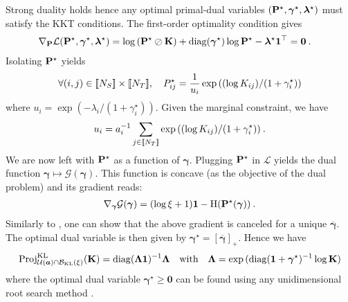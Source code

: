     Strong duality holds hence any optimal primal-dual variables $({\mathbf{P}}^\star, \bm{\gamma}^\star, \bm{\lambda}^\star)$ must satisfy the KKT conditions. The first-order optimality condition gives
    \begin{align}
        \nabla_{{\mathbf{P}}} \mathcal{L} ({\mathbf{P}}^\star, \bm{\gamma}^\star, \bm{\lambda}^\star) &= \log \left( {\mathbf{P}}^\star \oslash {\mathbf{K}} \right) + \operatorname{diag}(\bm{\gamma}^\star)\log{{\mathbf{P}}^\star} - \bm{\lambda}^\star \bm{1}^\top = \bm{0} \:.
    \end{align}
    Isolating ${\mathbf{P}}^\star$ yields
    \begin{align}
        \forall (i,j) \in {[\![N_S]\!]} \times {[\![N_T]\!]}, \quad P^\star_{ij} = \frac{1}{u_i} \exp{((\log K_{ij})/(1 + \gamma^\star_i))}
    \end{align}
    where $u_i = \exp{(-\lambda_i/(1 + \gamma^\star_i))}$. Given the marginal constraint, we have 
    \begin{equation}
        u_i = a_i^{-1} \sum_{j \in {[\![N_T]\!]}} \exp{((\log K_{ij})/(1 + \gamma^\star_i))} \:.
    \end{equation}
    We are now left with ${\mathbf{P}}^\star$ as a function of $\bm{\gamma}$. Plugging ${\mathbf{P}}^\star$ in $\mathcal{L}$ yields the dual function $\bm{\gamma} \mapsto \mathcal{G}(\bm{\gamma})$. This function is concave (as the objective of the dual problem) and its gradient reads:
    \begin{align}
        \nabla_{\bm{\gamma}} \mathcal{G}(\bm{\gamma}) = (\log \xi + 1 )\bm{1} - \operatorname{H}({\mathbf{P}}^\star(\bm{\gamma})) \:.
    \end{align}
    Similarly to , one can show that the above gradient is canceled for a unique $\overline{\bm{\gamma}}$. The optimal dual variable is then given by $\bm{\gamma}^\star = [\overline{\bm{\gamma}}]_+$.
    Hence we have 
    \begin{align}
        \operatorname{Proj}^{\operatorname{KL}}_{{\mathcal{U}}(\bm{a}) \cap \mathcal{B}_{\operatorname{KL}}(\xi)}(\mathbf{K}) = \operatorname{diag}(\mathbf{\Lambda} \mathbf{1})^{-1} \mathbf{\Lambda} \quad \text{with} \quad \mathbf{\Lambda} = \exp{(\operatorname{diag}(\bm{1} + \bm{\gamma}^\star)^{-1} \log \mathbf{K})}
    \end{align}
    where the optimal dual variable $\bm{\gamma}^\star \bm{\geq} \bm{0}$ can be found using any unidimensional root search method \citep{vladymyrov2013entropic}.


